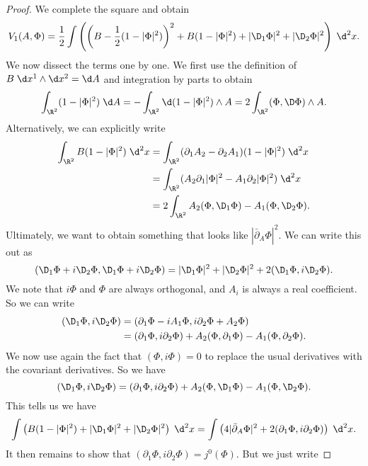 \documentclass[a4paper]{article}
\begin{document}
\begin{proof}
  We complete the square and obtain
  \[
    V_1(A, \Phi) = \frac{1}{2} \int \left(\left(B - \frac{1}{2}(1 - |\Phi|^2)\right)^2 + B(1 - |\Phi|^2) + |\D_1\Phi|^2 + |\D_2 \Phi|^2\right)\;\d^2 x.
  \]
  We now dissect the terms one by one. We first use the definition of $B \;\d x^1 \wedge \d x^2= \d A$ and integration by parts to obtain
  \[
    \int_{\R^2} (1 - |\Phi|^2) \;\d A = - \int_{\R^2} \d (1 - |\Phi|^2) \wedge A = 2 \int_{\R^2} (\Phi, \D \Phi) \wedge A.
  \]
  Alternatively, we can explicitly write
  \begin{align*}
    \int_{\R^2} B(1 - |\Phi|^2) \;\d^2 x &= \int_{\R^2} (\partial_1 A_2 - \partial_2 A_1) (1 - |\Phi|^2)\;\d ^2x\\
    &= \int_{\R^2} (A_2 \partial_1 |\Phi|^2 - A_1 \partial_2 |\Phi|^2) \;\d^2 x \\
    &= 2\int_{\R^2} A_2 (\Phi, \D_1 \Phi) - A_1 (\Phi, \D_2 \Phi).
  \end{align*}
  Ultimately, we want to obtain something that looks like $|\bar{\partial}_A \Phi|^2$. We can write this out as
  \[
    (\D_1 \Phi + i \D_2 \Phi, \D_1 \Phi + i \D_2 \Phi) = |\D_1 \Phi|^2 + |\D_2 \Phi|^2 + 2(\D_1 \Phi, i \D_2 \Phi).
  \]
  We note that $i\Phi$ and $\Phi$ are always orthogonal, and $A_i$ is always a real coefficient. So we can write
  \begin{align*}
    (\D_1 \Phi, i \D_2 \Phi) &= (\partial_1 \Phi - i A_1 \Phi, i \partial_2 \Phi + A_2 \Phi) \\
    &= (\partial_1 \Phi, i \partial _2 \Phi) + A_2 (\Phi, \partial_1 \Phi) - A_1 (\Phi, \partial_2 \Phi).
  \end{align*}
  We now use again the fact that $(\Phi, i\Phi) = 0$ to replace the usual derivatives with the covariant derivatives. So we have
  \[
    (\D_1 \Phi, i \D_2 \Phi) = (\partial_1 \Phi, i \partial_2 \Phi) + A_2 (\Phi, \D_1 \Phi) - A_1 (\Phi, \D_2 \Phi).
  \]
  This tells us we have
  \[
    \int \left(B(1 - |\Phi|^2) + |\D_1 \Phi|^2 + |\D_2 \Phi|^2\right)\;\d^2 x = \int \left(4 |\bar{\partial}_A \Phi|^2 + 2 (\partial_1 \Phi, i \partial_2 \Phi)\right)\;\d^2 x.
  \]
  It then remains to show that $(\partial_1 \Phi, i \partial_2 \Phi) = j^0(\Phi)$. But we just write

\end{proof}
\end{document}
